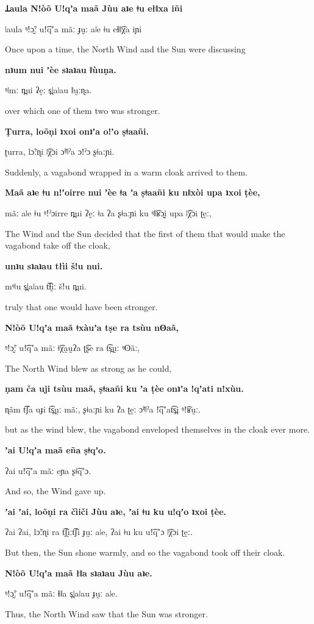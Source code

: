 \documentclass{beamer}
\newcommand{\slide}[4]{
\begin{frame}
	\begin{center}
		\vfill
		
		\textbf{\huge #1}
		
		\vfill
		
		{\large #2}
		
		\vfill
		
		{\huge #3}
		
		\vfill
		
		\emph{#4}
		
	\end{center}
\end{frame}
}
\newcommand{\interlinearslide}[3]{
\begin{frame}
	\begin{center}
		\vfill
		
		\textbf{\huge #1}
		
		\vfill
		
		{\large #2}
		
		\vfill
		
		{\huge #3}
		
		
	\end{center}
\end{frame}
}
\begin{document}
\begin{frame}

\end{frame}


\interlinearslide{Ʇaula Nǃòõ Uǃqʼa maã Jùu aʇe ǂu ełǁxa iñi}{ ǀaula ᵑǃɔ̰̃ː uǃ͡qʼa mãː ɟṵː aǀe ǂu eɬǁ͡χa iɲi}{Once upon a time, the North Wind and the Sun were discussing}

\interlinearslide{nʇum nui ʼèe sʇaʇau ǁùuṇa.}{ ᵑǀmː n̪ui ʔḛː s̪ǀaǀau ǁṵːɳa.}{over which one of them two was stronger.}

\interlinearslide{Ṭurra, loõṇi ʇxoi onʇʼa oǃʼo ṣǂaañi.}{ ʈurra, lɔ̃ːɳi ǀ͡χɔi ɔ̃ᵑǀˀa ɔǃˀɔ ʂǂaːɲi.}{Suddenly, a vagabond wrapped in a warm cloak arrived to them.}

\interlinearslide{Maã aʇe ǂu nǃʼoirre nui ʼèe ǂa ʼa ṣǂaañi ku nǁxòi upa ʇxoi ṭèe,}{ mãː aǀe ǂu ᵑǃˀɔirre n̪ui ʔḛː ǂa ʔa ʂǂaːɲi ku ᵑǁ͡ʁɔ̰ḭ upa ǀ͡χɔi ʈḛː,}{The Wind and the Sun decided that the first of them that would make the vagabond take off the cloak,}

\interlinearslide{unʇu sʇaʇau tłìi šǃu nui.}{ mᵑǀu s̪ǀaǀau t͡ɬḭː šǃu n̪ui.}{truly that one would have been stronger.}

\interlinearslide{Nǃòõ Uǃqʼa maã ǂxàuʼa tṣe ra tsùu nʘaã,}{ ᵑǃɔ̰̃ː uǃ͡qʼa mãː ǂ͡χa̰ṵʔa ʈ͡ʂe ra t͡s̪ṵː ᵑʘãː,}{The North Wind blew as strong as he could,}

\interlinearslide{ṇam ča uji tsùu maã, ṣǂaañi ku ʼa ṭèe onʇʼa ǃqʼati nǃxùu.}{ ɳãm t͡ʃa uɟi t͡s̪ṵː mãː, ʂǂaːɲi ku ʔa ʈḛː ɔ̃ᵑǀˀa ǃ͡qʼat͡s̪i ᵑǃ͡ʁṵː.}{but as the wind blew, the vagabond enveloped themselves in the cloak ever more.}

\interlinearslide{ʼai Uǃqʼa maã eña ṣǂqʼo.}{ ʔai uǃ͡qʼa mãː eɲa ʂǂ͡qʼɔ.}{And so, the Wind gave up.}

\interlinearslide{ʼai ʼai, loõṇi ra čìiči Jùu aʇe, ʼai ǂu ku uǃqʼo ʇxoi ṭèe.}{ ʔai ʔai, lɔ̃ːɳi ra t͡ʃḭːt͡ʃi ɟṵː aǀe, ʔai ǂu ku uǃ͡qʼɔ ǀ͡χɔi ʈḛː.}{But then, the Sun shone warmly, and so the vagabond took off their cloak.}

\interlinearslide{Nǃòõ Uǃqʼa maã łǁa sʇaʇau Jùu aʇe.}{ ᵑǃɔ̰̃ː uǃ͡qʼa mãː ɬǁa s̪ǀaǀau ɟṵː aǀe.}{Thus, the North Wind saw that the Sun was stronger.}

%
%
\end{document}

